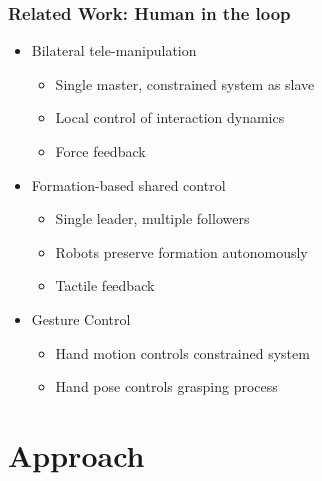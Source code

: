 \documentclass[student]{ITRslides}
\begin{document}
\begin{frame}
	\frametitle{Related Work: Human in the loop}
	\begin{itemize}
		\item Bilateral tele-manipulation  \cite{Lee_05}
		\begin{itemize}
			\item Single master, constrained system as slave
			\item Local control of interaction dynamics
			\item Force feedback
		\end{itemize}
		\item Formation-based shared control \cite{Sieber_15, Scheggi_14}
		\begin{itemize}
			\item Single leader, multiple followers
			\item Robots preserve formation autonomously
			\item Tactile feedback
		\end{itemize}
		\item Gesture Control \cite{Gioioso_2014}
		\begin{itemize}
			\item Hand motion controls constrained system
			\item Hand pose controls grasping process
		\end{itemize}
		\end{itemize}
\end{frame}

\section{Approach}
\end{document}
